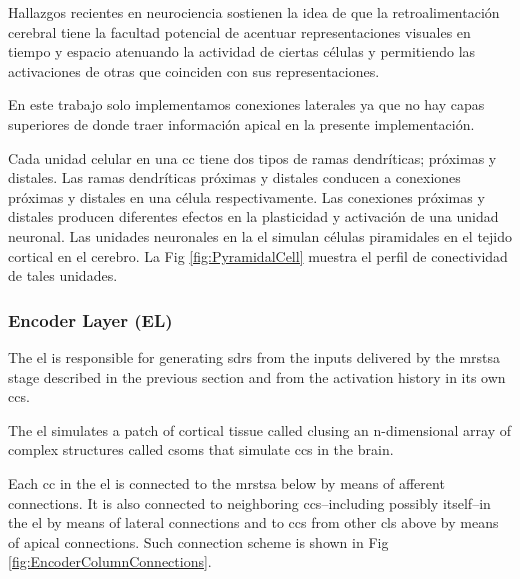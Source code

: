 {Hallazgos recientes en neurociencia \cite{Marques2018} sostienen la idea
de que la retroalimentación cerebral tiene la facultad potencial de acentuar representaciones visuales en tiempo y espacio
atenuando la actividad de ciertas células y permitiendo las activaciones de otras
que coinciden con sus representaciones.

En este trabajo solo implementamos conexiones laterales ya que
no hay capas superiores
de donde traer información apical en la presente implementación.

Cada unidad celular en una \gls{cc} tiene dos tipos de ramas dendríticas; próximas y distales.
Las ramas dendríticas próximas y distales conducen a conexiones próximas y distales en una célula respectivamente.
Las conexiones próximas y distales producen diferentes efectos en la plasticidad y activación de una unidad neuronal.
Las unidades neuronales en la \gls{el} simulan células piramidales en el tejido cortical en el cerebro.
La Fig \ref{fig:PyramidalCell} muestra el perfil de conectividad de tales unidades.
}{
\subsubsection{Encoder Layer (EL)}

The \gls{el} is responsible for generating \glspl{sdr} from the inputs delivered by the \gls{mrstsa} stage
described in the previous section and from the activation history in its own \glspl{cc}.

The \gls{el} simulates a patch of cortical tissue called \gls{cl}using an n-dimensional array of complex structures called \glspl{csom} that simulate \glspl{cc} in the brain.

Each \gls{cc} in the \gls{el} is connected to the \gls{mrstsa} below by means of afferent connections. It is also
connected to neighboring \glspl{cc}--including possibly itself--in the \gls{el} by means of lateral connections and
to \glspl{cc} from other \glspl{cl} above by means of apical connections. Such connection scheme is shown in Fig \ref{fig:EncoderColumnConnections}.

}
